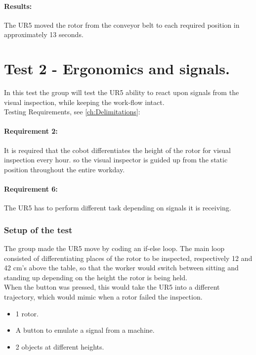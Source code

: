 \paragraph{Results:}
The UR5 moved the rotor from the conveyor belt to each required position in approximately 13 seconds. 


\section{Test 2 - Ergonomics and signals.}

In this test the group will test the UR5 ability to react upon signals from the visual inspection, while keeping the work-flow intact.\\
Testing Requirements, see \ref{ch:Delimitations}:

\paragraph{Requirement 2:} It is required that the cobot differentiates the height of the rotor for visual inspection every hour. so the visual inspector is guided up from the static position throughout the entire workday.
\paragraph{Requirement 6:} The UR5 has to perform different task depending on signals it is receiving.
\subsubsection{Setup of the test}

The group made the UR5 move by coding an if-else loop. The main loop consisted of differentiating places of the rotor to be inspected, respectively 12 and 42 cm's above the table, so that the worker would switch between sitting and standing up depending on the height the rotor is being held.\\
When the button was pressed, this would take the UR5 into a different trajectory, which would mimic when a rotor failed the inspection.

\begin{itemize}
    \item 1  rotor.
    \item A button to emulate a signal from a machine.
    \item 2 objects at different heights. 
\end{itemize}

